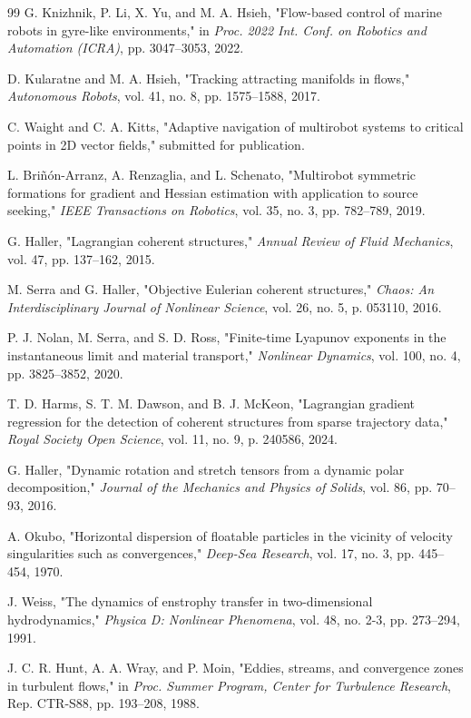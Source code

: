 \documentclass[lettersize,journal]{IEEEtran}
\begin{document}
\begin{thebibliography}{99}
 G. Knizhnik, P. Li, X. Yu, and M. A. Hsieh, "Flow-based control
of marine robots in gyre-like environments," in \textit{Proc. 2022 Int. Conf.
on Robotics and Automation (ICRA)}, pp. 3047--3053, 2022.

 D. Kularatne and M. A. Hsieh, "Tracking attracting manifolds in
flows," \textit{Autonomous Robots}, vol. 41, no. 8, pp. 1575--1588, 2017.

 C. Waight and C. A. Kitts, "Adaptive navigation of multirobot
systems to critical points in 2D vector fields," submitted for publication.

 L. Briñón-Arranz, A. Renzaglia, and L. Schenato, "Multirobot
symmetric formations for gradient and Hessian estimation with application to
source seeking," \textit{IEEE Transactions on Robotics}, vol. 35, no. 3,
pp. 782--789, 2019.

 G. Haller, "Lagrangian coherent structures," \textit{Annual
Review of Fluid Mechanics}, vol. 47, pp. 137--162, 2015.

 M. Serra and G. Haller, "Objective Eulerian coherent
structures," \textit{Chaos: An Interdisciplinary Journal of Nonlinear
Science}, vol. 26, no. 5, p. 053110, 2016.

 P. J. Nolan, M. Serra, and S. D. Ross, "Finite-time Lyapunov
exponents in the instantaneous limit and material transport,"
\textit{Nonlinear Dynamics}, vol. 100, no. 4, pp. 3825--3852, 2020.

 T. D. Harms, S. T. M. Dawson, and B. J. McKeon, "Lagrangian
gradient regression for the detection of coherent structures from sparse
trajectory data," \textit{Royal Society Open Science}, vol. 11, no. 9,
p. 240586, 2024.

 G. Haller, "Dynamic rotation and stretch tensors from a
dynamic polar decomposition," \textit{Journal of the Mechanics and Physics
of Solids}, vol. 86, pp. 70--93, 2016.

 A. Okubo, "Horizontal dispersion of floatable particles in the
vicinity of velocity singularities such as convergences," \textit{Deep-Sea
Research}, vol. 17, no. 3, pp. 445--454, 1970.

 J. Weiss, "The dynamics of enstrophy transfer in two-dimensional
hydrodynamics," \textit{Physica D: Nonlinear Phenomena}, vol. 48, no. 2-3,
pp. 273--294, 1991.

 J. C. R. Hunt, A. A. Wray, and P. Moin, "Eddies, streams, and
convergence zones in turbulent flows," in \textit{Proc. Summer Program,
Center for Turbulence Research}, Rep. CTR-S88, pp. 193--208, 1988.


\end{thebibliography}
\end{document}
